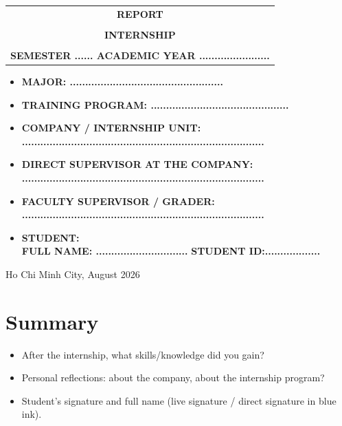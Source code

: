 \documentclass[a4paper]{article}
\begin{document}
\begin{titlepage}
\begin{center}
\begin{tabular}{c}
\multicolumn{1}{c}{\textbf{{\LARGE REPORT}}}\\
\\{\textbf{{\LARGE INTERNSHIP}}}
\\
\\
\textbf{\Large SEMESTER ...... ACADEMIC YEAR .......................} \\
\end{tabular}
\end{center}
\vspace{0.5cm}
\begin{itemize}
\renewcommand\labelitemi{--}
    \item \Large \textbf{MAJOR: ..................................................}
    \item \Large \textbf{TRAINING PROGRAM: .............................................}
\end{itemize}
\vspace{0.7cm}
\begin{itemize}
\renewcommand\labelitemi{--}
    \item \Large \textbf{COMPANY / INTERNSHIP UNIT:}
    \\ \Large \textbf{...............................................................................}
    \item \Large \textbf{DIRECT SUPERVISOR AT THE COMPANY:}
    \\ \Large \textbf{...............................................................................}
    \item \Large \textbf{FACULTY SUPERVISOR / GRADER:}
    \\ \Large \textbf{...............................................................................}
    \item \Large \textbf{STUDENT:}
    \\ \Large \textbf{FULL NAME: ..............................} \textbf{STUDENT ID:..................}
\end{itemize}
\vspace{0.5cm}
\begin{center}
{\Large Ho Chi Minh City, August 2026}
\end{center}
\end{titlepage}

\newpage
\tableofcontents
\newpage





\newpage
\section{Summary}
\begin{itemize}
    \item After the internship, what skills/knowledge did you gain?
    \item Personal reflections: about the company, about the internship program?
    \item Student's signature and full name (live signature / direct signature in blue ink).
\end{itemize}

\end{document}
